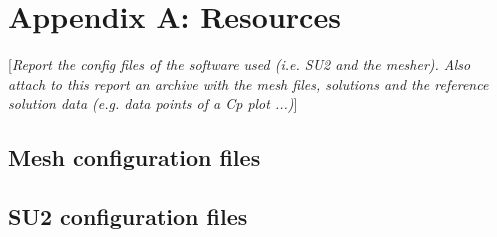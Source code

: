 \documentclass[11pt,polish, openany]{book}
\begin{document}



\pagebreak

\chapter*{Appendix A: Resources}
[\textit{Report the config files of the software used (i.e. SU2 \cite{economon2015su2} and the mesher). Also attach to this report an archive with the mesh files, solutions and the reference solution data (e.g. data points of a Cp plot ...)}]
\section*{Mesh configuration files}
\section*{SU2 configuration files}
\end{document}

